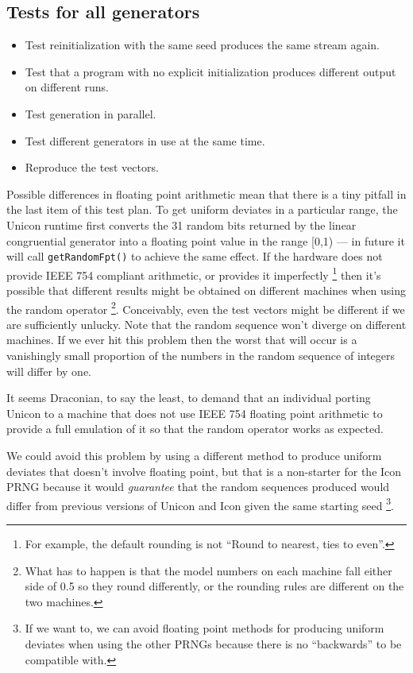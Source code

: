 \documentclass[letterpaper,12pt]{article}
\begin{document}
\subsection{Tests for all generators}
\begin{itemize}
\item
  Test reinitialization with the same seed produces the same stream again.
\item
  Test that a program with no explicit initialization produces different
  output on different runs.
\item
  Test generation in parallel.
\item
  Test different generators in use at the same time.
\item
  Reproduce the test vectors.
\end{itemize}

Possible differences in floating point arithmetic mean that there is a tiny
pitfall in the last item of this test plan. To get uniform deviates in a
particular range, the Unicon runtime first converts the 31 random bits
returned by the linear congruential generator into a floating point value
in the range [0,1) --- in future it will call \texttt{getRandomFpt()} to
achieve the same effect.  If the hardware does not provide IEEE 754
compliant arithmetic, or provides it imperfectly%
\footnote{
  For example, the default rounding is not ``Round to nearest, ties to
  even''.
  }
then it's possible that different results might be obtained on different
machines when using the random operator%
\footnote{
  What has to happen is that the model numbers on each machine fall either
  side of 0.5 so they round differently, or the rounding rules are
  different on the two machines.
}.
Conceivably, even the test vectors might be different if we are
sufficiently unlucky. Note that the random sequence won't diverge on
different machines. If we ever hit this problem then the worst that will
occur is a vanishingly small proportion of the numbers in the random
sequence of integers will differ by one.

It seems Draconian, to say the least, to demand that an individual porting
Unicon to a machine that does not use IEEE 754 floating point arithmetic to
provide a full emulation of it so that the random operator works as
expected.

We could avoid this problem by using a different method to produce
uniform deviates that doesn't involve floating point, but that is a
non-starter for the Icon PRNG because it would {\em guarantee} that the
random sequences produced would differ from previous versions of Unicon and
Icon given the same starting seed%
\footnote{
  If we want to, we can avoid floating point methods for producing uniform
  deviates when using the other PRNGs because there is no ``backwards'' to
  be compatible with.
}.
\end{document}
